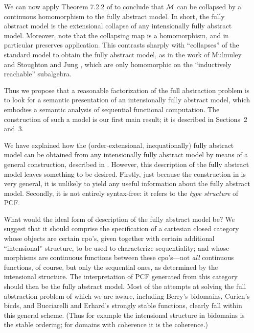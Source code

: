 \documentclass[11pt]{article}
\begin{document}
We can now apply Theorem 7.2.2 of \cite{StoughtonA:fulamp} to conclude
that ${\cal M}$ 
can be collapsed by a continuous homomorphism to the fully abstract model.
In short, the fully abstract model is the extensional collapse of
any intensionally fully abstract model. Moreover, note that the collapsing
map is  a homomorphism, and in particular preserves application. This
contrasts sharply with ``collapses'' of the standard model to obtain the
fully abstract model, as in the work of Mulmuley \cite{MulmuleyK:fulase} and
Stoughton and Jung \cite{JungA:stufam}, which are only homomorphic on the
``inductively reachable'' subalgebra.

Thus we propose that a reasonable factorization of the full abstraction
problem is to look for  a semantic presentation of an intensionally
fully abstract model, which embodies a semantic analysis of sequential
functional computation. 
The construction of such a model is our first main result; it is described
in Sections~2 and~3.

We have explained how the (order-extensional, inequationally) fully abstract
model can be obtained from any intensionally fully abstract model
by means of a general construction, described in \cite{StoughtonA:fulamp}. 
However, this description of the fully
abstract model leaves something to be desired. Firstly, just because the
construction in \cite{StoughtonA:fulamp} is very general, it is
unlikely to yield any useful information
about the fully abstract model. Secondly, it is not entirely syntax-free:
it refers to the {\sl type structure} of PCF.

What would the ideal form of description of the fully abstract model be?
We suggest that it should comprise the specification of a cartesian closed
category whose objects are certain cpo's, given together with certain
additional ``intensional'' structure, to be used to characterize sequentiality;
and whose morphisms are continuous functions between these cpo's---not
{\sl all} continuous functions, of course, but only the sequential ones,
as determined by the intensional structure. The interpretation of PCF
generated from this category should then be the fully abstract model.
Most of the attempts at solving the full abstraction problem of which we
are aware, including Berry's bidomains, Curien's bicds, and Bucciarelli
and Erhard's strongly stable functions, clearly fall within this general
scheme. (Thus for example the intensional structure in bidomains is the
stable ordering; for domains with coherence it is the coherence.)
\end{document}
